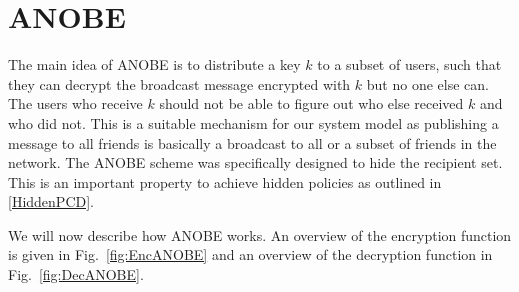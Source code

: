 \begin{frame}
\printbibliography{}
\end{frame}


\appendix
\section{\Acl{ANOBE}}\label{ANOBE}


The main idea of \ac{ANOBE} is to distribute a key \(k\) to a subset of users, 
such that they can decrypt the broadcast message encrypted with \(k\) but no 
one else can.
The users who receive \(k\) should not be able to figure out who else received 
\(k\) and who did not.
This is a suitable mechanism for our system model as publishing a message to 
all friends is basically a broadcast to all or a subset of friends in the 
network.
The \ac{ANOBE} scheme was specifically designed to hide the recipient set.
This is an important property to achieve hidden policies as outlined in 
\cref{HiddenPCD}.

We will now describe how \ac{ANOBE} works.
An overview of the encryption function is given in Fig.~\ref{fig:EncANOBE} and 
an overview of the decryption function in Fig.~\ref{fig:DecANOBE}.

